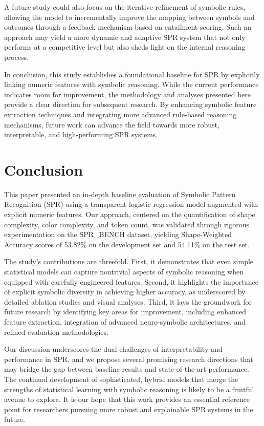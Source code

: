 \documentclass{article}
\begin{document}
A future study could also focus on the iterative refinement of symbolic rules, allowing the model to incrementally improve the mapping between symbols and outcomes through a feedback mechanism based on entailment scoring. Such an approach may yield a more dynamic and adaptive SPR system that not only performs at a competitive level but also sheds light on the internal reasoning process.

In conclusion, this study establishes a foundational baseline for SPR by explicitly linking numeric features with symbolic reasoning. While the current performance indicates room for improvement, the methodology and analyses presented here provide a clear direction for subsequent research. By enhancing symbolic feature extraction techniques and integrating more advanced rule-based reasoning mechanisms, future work can advance the field towards more robust, interpretable, and high-performing SPR systems.

\section{Conclusion}
This paper presented an in-depth baseline evaluation of Symbolic Pattern Recognition (SPR) using a transparent logistic regression model augmented with explicit numeric features. Our approach, centered on the quantification of shape complexity, color complexity, and token count, was validated through rigorous experimentation on the SPR\_BENCH dataset, yielding Shape-Weighted Accuracy scores of 53.82\% on the development set and 54.11\% on the test set.

The study’s contributions are threefold. First, it demonstrates that even simple statistical models can capture nontrivial aspects of symbolic reasoning when equipped with carefully engineered features. Second, it highlights the importance of explicit symbolic diversity in achieving higher accuracy, as underscored by detailed ablation studies and visual analyses. Third, it lays the groundwork for future research by identifying key areas for improvement, including enhanced feature extraction, integration of advanced neuro-symbolic architectures, and refined evaluation methodologies.

Our discussion underscores the dual challenges of interpretability and performance in SPR, and we propose several promising research directions that may bridge the gap between baseline results and state-of-the-art performance. The continual development of sophisticated, hybrid models that merge the strengths of statistical learning with symbolic reasoning is likely to be a fruitful avenue to explore. It is our hope that this work provides an essential reference point for researchers pursuing more robust and explainable SPR systems in the future.



\end{document}
